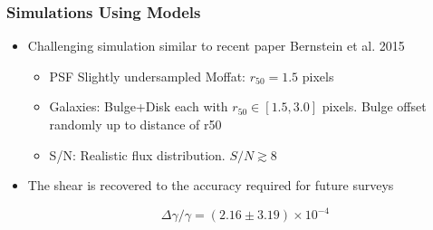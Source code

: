 \documentclass{beamer}
\begin{document}
\frame
{
    \frametitle{Simulations Using Models}

 
    \begin{itemize}

        \item Challenging simulation similar to recent paper Bernstein et al. 2015

            \begin{itemize}
                \item {\color{cyan} PSF} Slightly undersampled Moffat: $r_{50}=1.5$ pixels

                \item {\color{cyan} Galaxies}: Bulge+Disk each with $r_{50} \in [1.5, 3.0]$ pixels.  Bulge
                    offset randomly up to distance of r50

                \item {\color{cyan} S/N}: Realistic flux distribution.  $S/N \gtrsim 8$
            \end{itemize}

        \item The shear is recovered to the accuracy required for future
            surveys

            {\color{gold}
                \begin{equation}
                    \Delta \gamma/\gamma = (2.16 \pm 3.19) \times 10^{-4} \nonumber
                \end{equation}
            }

    \end{itemize}

}
\end{document}
